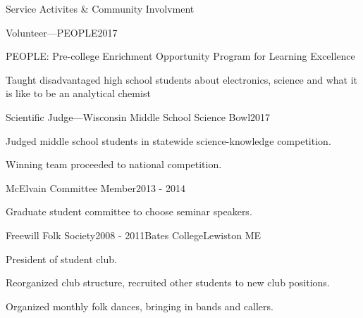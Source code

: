 \documentclass{resume}  %
\begin{document}
\pagebreak
\begin{rSection}{Service Activites \& Community Involvment}

\begin{rSubsection}{Volunteer---PEOPLE}{2017}{}{}
	\item PEOPLE: Pre-college Enrichment Opportunity Program for Learning Excellence
	\item Taught disadvantaged high school students about electronics, science and what it is like to be an analytical chemist
\end{rSubsection}

\begin{rSubsection}{Scientific Judge---Wisconsin Middle School Science Bowl}{2017}{}{}
\item Judged middle school students in statewide science-knowledge competition.
\item Winning team proceeded to national competition.
\end{rSubsection}

\begin{rSubsection}{McElvain Committee Member}{2013 - 2014}{}{}
\item Graduate student committee to choose seminar speakers.
\end{rSubsection}

\begin{rSubsection}{Freewill Folk Society}{2008 - 2011}{Bates College}{Lewiston ME}
\item President of student club.
\item Reorganized club structure, recruited other students to new club positions.
\item Organized monthly folk dances, bringing in bands and callers.
\end{rSubsection}

\end{rSection}
\end{document}
